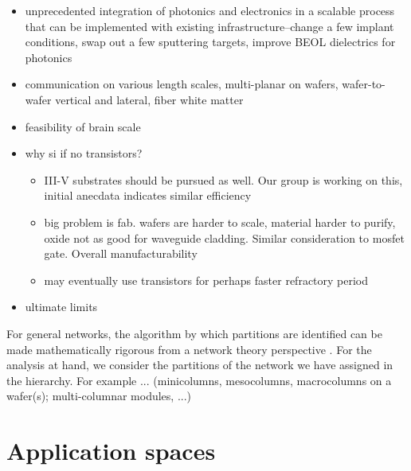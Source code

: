 \documentclass[twocolumn]{article}
\begin{document}
\begin{itemize}
\item unprecedented integration of photonics and electronics in a scalable process that can be implemented with existing infrastructure--change a few implant conditions, swap out a few sputtering targets, improve BEOL dielectrics for photonics
\item communication on various length scales, multi-planar on wafers, wafer-to-wafer vertical and lateral, fiber white matter
\item feasibility of brain scale
\item why si if no transistors?
\begin{itemize}
\item III-V substrates should be pursued as well. Our group is working on this, initial anecdata indicates similar efficiency
\item big problem is fab. wafers are harder to scale, material harder to purify, oxide not as good for waveguide cladding. Similar consideration to mosfet gate. Overall manufacturability
\item may eventually use transistors for perhaps faster refractory period
\end{itemize}
\item ultimate limits
\end{itemize}


For general networks, the algorithm by which partitions are identified can be made mathematically rigorous from a network theory perspective \cite{oz1992,oz2004}. For the analysis at hand, we consider the partitions of the network we have assigned in the hierarchy. For example ... (minicolumns, mesocolumns, macrocolumns on a wafer(s); multi-columnar modules, ...) 

\section{\label{sec:applications}Application spaces}
\end{document}
